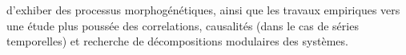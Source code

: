 d'exhiber des processus morphogénétiques, ainsi que les travaux empiriques vers une étude plus poussée des correlations, causalités (dans le cas de séries temporelles) et recherche de décompositions modulaires des systèmes.



\stars






